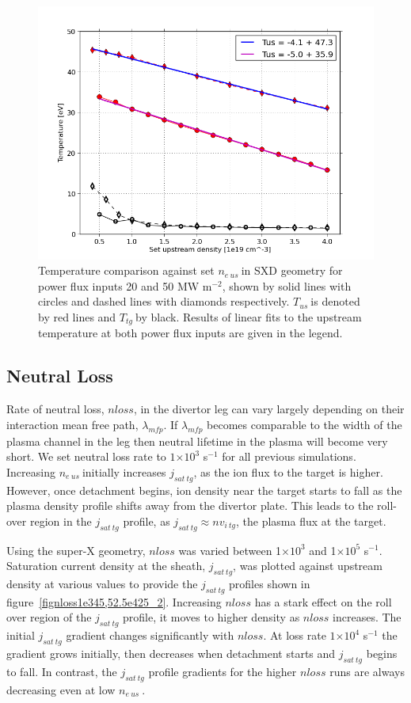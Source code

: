 \documentclass[12pt]{article}  %
\providecommand{\e}[1]{\ensuremath{\times 10^{#1}}} %
\providecommand{\pow}[1]{{$^{#1}$}} %
\providecommand{\neus}{$n_{e~us}~$} %
\providecommand{\Tus}{$T_{us}~$} %
\providecommand{\Ttg}{$T_{tg}~$} %
\begin{document}
\begin{figure}
\includegraphics[scale=0.5]{Figures/sol1d/SXDPFfit.png}
\centering
\caption{Temperature comparison against set \neus in SXD geometry for power flux inputs 20 and 50 MW m\pow{-2}, shown by solid lines with circles and dashed lines with diamonds respectively. \Tus is denoted by red lines and \Ttg by black. Results of linear fits to the upstream temperature at both power flux inputs are given in the legend.}\label{figSXDPFfit}
\end{figure}


\subsection{Neutral Loss}\label{ssecNloss}
Rate of neutral loss, $nloss$, in the divertor leg can vary largely depending on their interaction mean free path, $\lambda_{mfp}$. If $\lambda_{mfp}$ becomes comparable to the width of the plasma channel in the leg then neutral lifetime in the plasma will become very short. We set neutral loss rate to $1\e{3}$ s\pow{-1} for all previous simulations. Increasing \neus initially increases $j_{sat~tg}$, as the ion flux to the target is higher. However, once detachment begins, ion density near the target starts to fall as the plasma density profile shifts away from the divertor plate. This leads to the roll-over region in the $j_{sat~tg}$ profile, as $j_{sat~tg} \approx nv_{i~tg}$, the plasma flux at the target.

Using the super-X geometry, $nloss$ was varied between 1\e{3} and 1\e{5} s\pow{-1}. Saturation current density at the sheath, $j_{sat~tg}$, was plotted against upstream density at various values to provide the $j_{sat~tg}$ profiles shown in figure~\ref{fignloss1e345,52.5e425_2}. Increasing $nloss$ has a stark effect on the roll over region of the $j_{sat~tg}$ profile, it moves to higher density as $nloss$ increases. The initial $j_{sat~tg}$ gradient changes significantly with $nloss$. At loss rate $1\e{4}$ s\pow{-1} the gradient grows initially, then decreases when detachment starts and $j_{sat~tg}$ begins to fall. In contrast, the $j_{sat~tg}$ profile gradients for the higher $nloss$ runs are always decreasing even at low \neus. 
\end{document}
